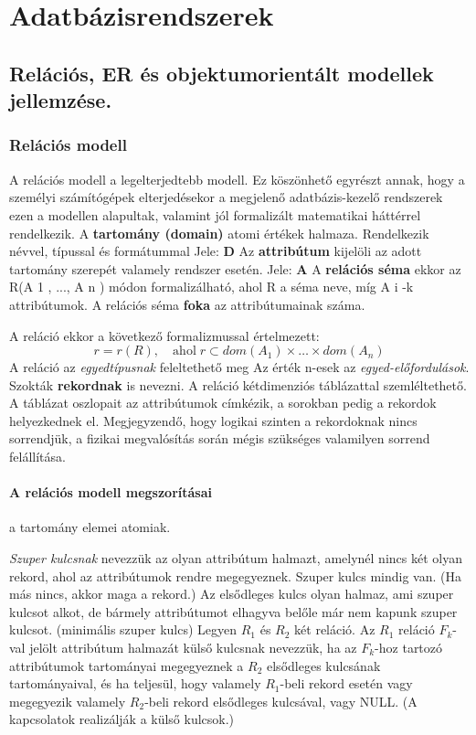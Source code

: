 \section{Adatbázisrendszerek}
\subsection{Relációs, ER és objektumorientált modellek jellemzése.}
\subsubsection{Relációs modell}
A relációs modell a legelterjedtebb modell. Ez köszönhető egyrészt annak, hogy a
személyi számítógépek elterjedésekor a megjelenő adatbázis-kezelő rendszerek ezen a modellen alapultak, valamint jól formalizált matematikai háttérrel rendelkezik.
A \textbf{tartomány (domain)} atomi értékek halmaza. Rendelkezik névvel, típussal és formátummal Jele: \textbf{D}
Az \textbf{attribútum} kijelöli az adott tartomány szerepét valamely rendszer esetén. Jele: \textbf{A}
A \textbf{relációs séma} ekkor az R(A 1 , ..., A n ) módon formalizálható, ahol R a séma neve, míg A i -k attribútumok. A relációs séma \textbf{foka} az attribútumainak száma.

A reláció ekkor a következő formalizmussal értelmezett:
$$r = r(R),\quad \text{ahol}\; r \subset dom(A_1) \times \dots \times dom(A_n)$$
A reláció az \emph{egyedtípusnak} feleltethető meg Az érték n-esek az \emph{egyed-előfordulások}. Szokták \textbf{rekordnak} is nevezni. A reláció kétdimenziós táblázattal szemléltethető. A táblázat oszlopait az attribútumok címkézik, a sorokban pedig a rekordok helyezkednek el. Megjegyzendő, hogy logikai szinten a rekordoknak nincs sorrendjük, a fizikai megvalósítás során mégis szükséges valamilyen sorrend felállítása.
\paragraph{A relációs modell megszorításai}
\begin{description}[nosep]
	\item[Tartomány megszorítás] a tartomány elemei atomiak.
	\item[Kulcs megszorítás] \emph{Szuper kulcsnak} nevezzük az olyan attribútum halmazt, amelynél nincs két olyan rekord, ahol az attribútumok rendre megegyeznek. Szuper kulcs mindig van. (Ha más nincs, akkor maga a rekord.) Az elsődleges kulcs olyan halmaz, ami szuper kulcsot alkot, de bármely attribútumot elhagyva belőle már nem kapunk szuper kulcsot. (minimális szuper kulcs) Legyen $R_1$ és $R_2$ két reláció. Az $R_1$ reláció $F_k$-val jelölt attribútum halmazát külső kulcsnak nevezzük, ha az $F_k$-hoz tartozó attribútumok tartományai megegyeznek a $R_2$ elsődleges kulcsának tartományaival, és ha teljesül, hogy valamely $R_1$-beli rekord esetén vagy megegyezik valamely $R_2$-beli rekord elsődleges kulcsával, vagy NULL. (A kapcsolatok realizálják a külső kulcsok.)
\end{description}

